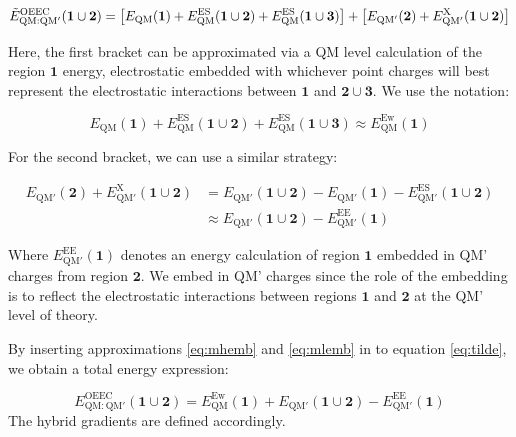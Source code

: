 \begin{equation}
\tilde{E}^{\text{OEEC}}_{\text{QM}:\text{QM}'}(\bm{1} \cup \bm{2}) = \big [ E_{\text{QM}}(\bm{1}) + E_{\text{QM}}^{\text{ES}}(\bm{1} \cup \bm{2}) + E_{\text{QM}}^{\text{ES}}(\bm{1} \cup \bm{3}) \big ] + \big [ E_{\text{QM}'}(\bm{2}) + E_{\text{QM}'}^{\text{X}}(\bm{1} \cup \bm{2}) \big ]\\
\label{eq:tilde}
\end{equation}

Here, the first bracket can be approximated via a QM level calculation of the region $\bm{1}$ energy, electrostatic embedded with whichever point charges will best represent the electrostatic interactions between $\bm{1}$ and $\bm{2} \cup \bm{3}$. We use the notation:


\begin{equation}
E_{\text{QM}}(\bm{1}) + E_{\text{QM}}^{\text{ES}}(\bm{1} \cup \bm{2}) + E_{\text{QM}}^{\text{ES}}(\bm{1} \cup \bm{3}) \approx E_{\text{QM}}^{\text{Ew}}(\bm{1})
\label{eq:mhemb}
\end{equation}

For the second bracket, we can use a similar strategy:

\begin{equation}
\begin{split}
E_{\text{QM}'}(\bm{2}) + E_{\text{QM}'}^{\text{X}}(\bm{1} \cup \bm{2}) & = E_{\text{QM}'}(\bm{1} \cup \bm{2}) - E_{\text{QM}'}(\bm{1}) - E_{\text{QM}'}^{\text{ES}}(\bm{1} \cup \bm{2})\\
& \approx E_{\text{QM}'}(\bm{1} \cup \bm{2}) - E_{\text{QM}'}^{\text{EE}}(\bm{1})
\end{split}
\label{eq:mlemb}
\end{equation}

Where $E_{\text{QM}'}^{\text{EE}}(\bm{1})$ denotes an energy calculation of region $\bm{1}$ embedded in QM' charges from region $\bm{2}$. We embed in QM' charges since the role of the embedding is to reflect the electrostatic interactions between regions $\bm{1}$ and $\bm{2}$ at the QM' level of theory.

By inserting approximations \ref{eq:mhemb} and \ref{eq:mlemb} in to equation \ref{eq:tilde}, we obtain a total energy expression:

\begin{equation}
E_{\text{QM}:\text{QM}'}^{\text{OEEC}}(\bm{1} \cup \bm{2}) = E_{\text{QM}}^{\text{Ew}}(\bm{1}) + E_{\text{QM}'}(\bm{1} \cup \bm{2}) - E_{\text{QM}'}^{\text{EE}}(\bm{1})
\label{eq:ener_sup}
\end{equation}
The hybrid gradients are defined accordingly.

